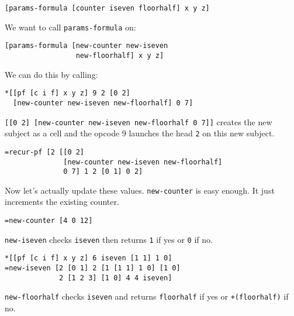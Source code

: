 \documentclass[twoside]{article}
\begin{document}
\begin{lstlisting}[style=listingblock]
[params-formula [counter iseven floorhalf] x y z]
\end{lstlisting}

\noindent
We want to call \lstinline[style=inlinecode]{params-formula} on:

\begin{lstlisting}[style=listingblock]
[params-formula [new-counter new-iseven
                 new-floorhalf] x y z]
\end{lstlisting}

\noindent
We can do this by calling:

\begin{lstlisting}[style=listingblock]
*[[pf [c i f] x y z] 9 2 [0 2]
  [new-counter new-iseven new-floorhalf] 0 7]
\end{lstlisting}

\noindent
\lstinline[style=inlinecode]{[[0 2] [new-counter new-iseven new-floorhalf 0 7]]} creates the new subject as a cell and the opcode 9 launches the head \lstinline[style=inlinecode]{2} on this new subject.

\begin{lstlisting}[style=listingblock]
=recur-pf [2 [[0 2]
              [new-counter new-iseven new-floorhalf]
              0 7] 1 2 [0 1] 0 2]
\end{lstlisting}

\noindent
Now let's actually update these values. \lstinline[style=inlinecode]{new-counter} is easy enough. It just increments the existing counter.

\begin{lstlisting}[style=listingblock]
=new-counter [4 0 12]
\end{lstlisting}

\noindent
\lstinline[style=inlinecode]{new-iseven} checks \lstinline[style=inlinecode]{iseven} then returns \lstinline[style=inlinecode]{1} if yes or \lstinline[style=inlinecode]{0} if no.

\begin{lstlisting}[style=listingblock]
*[[pf [c i f] x y z] 6 iseven [1 1] 1 0]
=new-iseven [2 [0 1] 2 [1 [1 1] 1 0] [1 0]
             2 [1 2 3] [1 0] 4 4 iseven]
\end{lstlisting}

\noindent
\lstinline[style=inlinecode]{new-floorhalf} checks \lstinline[style=inlinecode]{iseven} and returns \lstinline[style=inlinecode]{floorhalf} if yes or \lstinline[style=inlinecode]{+(floorhalf)} if no.
\end{document}
